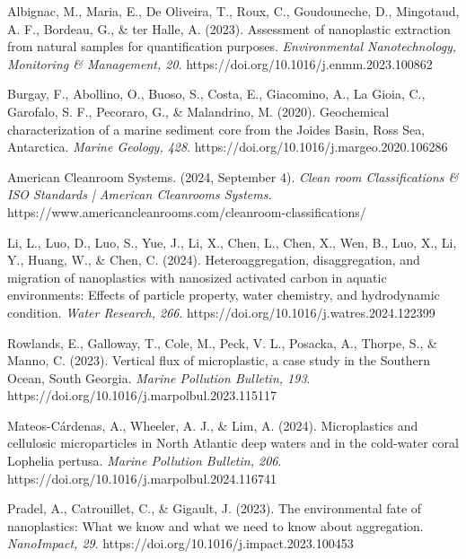 \documentclass[twocolumn,a4paper,aps,amsmath,amssymb,floatfix,superscriptaddress]{revtex4-2}
\begin{document}
	\begin{thebibliography}{99}		
		Albignac, M., Maria, E., De Oliveira, T., Roux, C., Goudouneche, D., Mingotaud, A. F., Bordeau, G., \& ter Halle, A. (2023). Assessment of nanoplastic extraction from natural samples for quantification purposes. \textit{Environmental Nanotechnology, Monitoring \& Management, 20}. https://doi.org/10.1016/j.enmm.2023.100862
		
		Burgay, F., Abollino, O., Buoso, S., Costa, E., Giacomino, A., La Gioia, C., Garofalo, S. F., Pecoraro, G., \& Malandrino, M. (2020). Geochemical characterization of a marine sediment core from the Joides Basin, Ross Sea, Antarctica. \textit{Marine Geology, 428}. https://doi.org/10.1016/j.margeo.2020.106286 
				
		American Cleanroom Systems. (2024, September 4). \textit{Clean room Classifications \& ISO Standards | American Cleanrooms Systems.} https://www.americancleanrooms.com/cleanroom-classifications/
		
		Li, L., Luo, D., Luo, S., Yue, J., Li, X., Chen, L., Chen, X., Wen, B., Luo, X., Li, Y., Huang, W., \& Chen, C. (2024). Heteroaggregation, disaggregation, and migration of nanoplastics with nanosized activated carbon in aquatic environments: Effects of particle property, water chemistry, and hydrodynamic condition. \textit{Water Research, 266}. https://doi.org/10.1016/j.watres.2024.122399
		
		Rowlands, E., Galloway, T., Cole, M., Peck, V. L., Posacka, A., Thorpe, S., \& Manno, C. (2023). Vertical flux of microplastic, a case study in the Southern Ocean, South Georgia. \textit{Marine Pollution Bulletin, 193}. https://doi.org/10.1016/j.marpolbul.2023.115117
		
		Mateos-Cárdenas, A., Wheeler, A. J., \& Lim, A. (2024). Microplastics and cellulosic microparticles in North Atlantic deep waters and in the cold-water coral Lophelia pertusa. \textit{Marine Pollution Bulletin, 206}. https://doi.org/10.1016/j.marpolbul.2024.116741
		
		Pradel, A., Catrouillet, C., \& Gigault, J. (2023). The environmental fate of nanoplastics: What we know and what we need to know about aggregation. \textit{NanoImpact, 29}. https://doi.org/10.1016/j.impact.2023.100453
		

\end{thebibliography}
\end{document}
